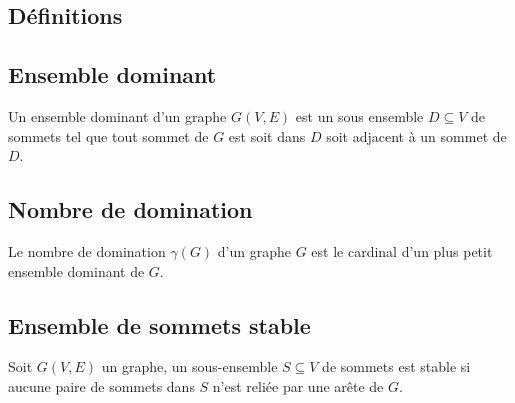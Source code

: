 \begin{appendix}
\section{Définitions}
\subsection{Ensemble dominant}
\label{def:ensemble_dominant}
Un ensemble dominant d'un graphe $G(V, E)$ est un sous ensemble $D \subseteq V$ de sommets tel que tout sommet de $G$ est soit dans $D$ soit adjacent à un sommet de $D$.
\subsection{Nombre de domination}
\label{def:nombre_de_domination}
Le nombre de domination $\gamma(G)$ d'un graphe $G$ est le cardinal d'un plus petit ensemble dominant de $G$.
\subsection{Ensemble de sommets stable}
\label{def:ensemble_de_sommets_stable}
Soit $G(V, E)$ un graphe, un sous-ensemble $S \subseteq V$ de sommets est stable si aucune paire de sommets dans $S$ n'est reliée par une arête de $G$.
\end{appendix}